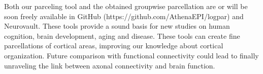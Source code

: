 Both our parceling tool and the obtained groupwise parcellation are or will
be soon freely available in GitHub (https://github.com/AthenaEPI/logpar) and
Neurovault. These tools provide a 
sound basis for new studies on human cognition, brain development, aging 
and disease. These tools can create fine parcellations of cortical areas, 
improving our knowledge about cortical organization. Future comparison with 
functional connectivity could lead to finally unraveling the link between axonal
connectivity and brain function. \\

%
%
